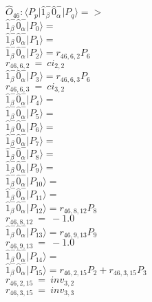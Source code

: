 \documentclass[14pt]{article}
\begin{document}
    $\hat{O}_{46}:  \langle{P_p}\vert \hat{1}_{\beta}^{-}\hat{0}_{\alpha}^{-} \vert{P_q}\rangle => $ \\ 
    $ \hat{1}_{\beta}^{-}\hat{0}_{\alpha}^{-} \vert{P_{0}}\rangle =  $ \\ 
    $ \hat{1}_{\beta}^{-}\hat{0}_{\alpha}^{-} \vert{P_{1}}\rangle =  $ \\ 
    $ \hat{1}_{\beta}^{-}\hat{0}_{\alpha}^{-} \vert{P_{2}}\rangle = {r}_{46,6,2}P_{6} $ \\ 
    ${r}_{46,6,2}\ =\ {ci}_{2,2} $ \\ 
    $ \hat{1}_{\beta}^{-}\hat{0}_{\alpha}^{-} \vert{P_{3}}\rangle = {r}_{46,6,3}P_{6} $ \\ 
    ${r}_{46,6,3}\ =\ {ci}_{3,2} $ \\ 
    $ \hat{1}_{\beta}^{-}\hat{0}_{\alpha}^{-} \vert{P_{4}}\rangle =  $ \\ 
    $ \hat{1}_{\beta}^{-}\hat{0}_{\alpha}^{-} \vert{P_{5}}\rangle =  $ \\ 
    $ \hat{1}_{\beta}^{-}\hat{0}_{\alpha}^{-} \vert{P_{6}}\rangle =  $ \\ 
    $ \hat{1}_{\beta}^{-}\hat{0}_{\alpha}^{-} \vert{P_{7}}\rangle =  $ \\ 
    $ \hat{1}_{\beta}^{-}\hat{0}_{\alpha}^{-} \vert{P_{8}}\rangle =  $ \\ 
    $ \hat{1}_{\beta}^{-}\hat{0}_{\alpha}^{-} \vert{P_{9}}\rangle =  $ \\ 
    $ \hat{1}_{\beta}^{-}\hat{0}_{\alpha}^{-} \vert{P_{10}}\rangle =  $ \\ 
    $ \hat{1}_{\beta}^{-}\hat{0}_{\alpha}^{-} \vert{P_{11}}\rangle =  $ \\ 
    $ \hat{1}_{\beta}^{-}\hat{0}_{\alpha}^{-} \vert{P_{12}}\rangle = {r}_{46,8,12}P_{8} $ \\ 
    ${r}_{46,8,12}\ =\ -1.0 $ \\ 
    $ \hat{1}_{\beta}^{-}\hat{0}_{\alpha}^{-} \vert{P_{13}}\rangle = {r}_{46,9,13}P_{9} $ \\ 
    ${r}_{46,9,13}\ =\ -1.0 $ \\ 
    $ \hat{1}_{\beta}^{-}\hat{0}_{\alpha}^{-} \vert{P_{14}}\rangle =  $ \\ 
    $ \hat{1}_{\beta}^{-}\hat{0}_{\alpha}^{-} \vert{P_{15}}\rangle = {r}_{46,2,15}P_{2}+{r}_{46,3,15}P_{3} $ \\ 
    ${r}_{46,2,15}\ =\ {inv}_{3,2} $ \\ 
    ${r}_{46,3,15}\ =\ {inv}_{3,3} $ \\ 
    
\end{document}
